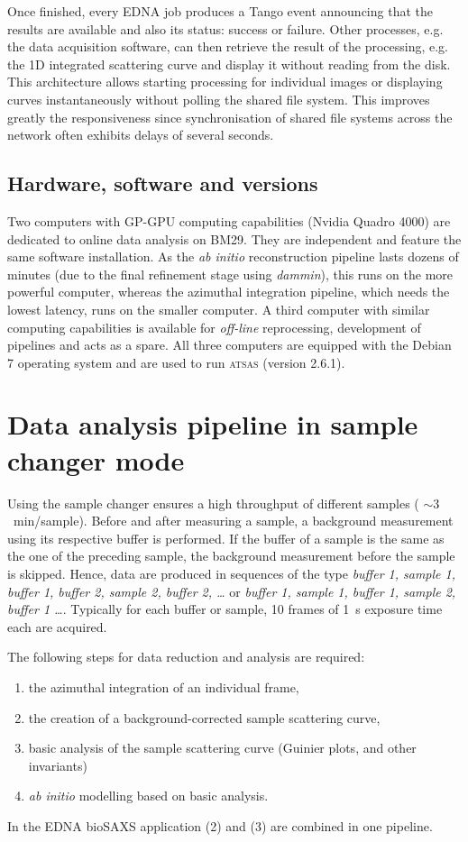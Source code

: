 \documentclass[preprint,pdf]{iucr}              %
\begin{document}
Once finished, every EDNA job produces  a Tango event announcing that the
results are available and also its status: success or failure.
Other processes, e.g. the data acquisition software, can then retrieve the result
of the processing, e.g. the 1D integrated scattering curve and
display it without reading from the disk.
This architecture allows starting processing for individual images or
displaying curves instantaneously without polling the shared file system.
This improves greatly the responsiveness since synchronisation of shared
file systems across the network often exhibits delays of several
seconds.

\subsection{Hardware, software and versions}
Two computers with GP-GPU computing capabilities (Nvidia Quadro 4000) are
dedicated to online data analysis on BM29. 
They are independent and feature the same software installation.
As the \textit{ab initio} reconstruction pipeline lasts dozens of minutes
(due to the final refinement stage using \textit{dammin}), this runs on the
more powerful computer, whereas the azimuthal integration pipeline, which needs
the lowest latency, runs on the smaller computer.
A third computer with similar computing capabilities is available for
\textit{off-line} reprocessing, development of pipelines and acts as a spare.
All three computers are equipped with the Debian 7 operating system and are
used to run \textsc{atsas} (version 2.6.1).



\section{Data analysis pipeline in sample changer mode}

Using the sample changer ensures a high throughput of different samples (
$\sim 3$~min/sample).
Before and after measuring a sample, a background measurement using its
respective buffer is performed.
If the buffer of a sample is the same as the one of the preceding sample, the
background measurement before the sample is skipped.
Hence, data are produced in sequences of the type \textit{buffer 1, sample 1,
buffer 1, buffer 2, sample 2, buffer 2, \ldots}  or  \textit{buffer 1, sample 1,
buffer 1,  sample 2, buffer 1 \ldots}.
Typically for each buffer or sample, 10 frames of 1~s exposure time each are
acquired.

The following steps for data reduction and analysis are required:
\begin{enumerate}
\item the azimuthal integration of an individual frame,
\item the creation of a background-corrected sample scattering curve,
\item basic analysis of the sample scattering curve (Guinier plots, and other
invariants)
\item \textit{ab initio} modelling based on basic analysis.
\end{enumerate}
In the EDNA bioSAXS application (2) and (3) are combined in one pipeline.
\end{document}
